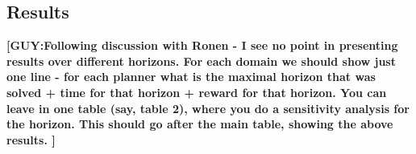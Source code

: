 \documentclass[letterpaper]{article} %
\theoremstyle{definition}
\newcommand{\guy}[1]{\textbf{[\color{orange}GUY:#1]}}
\begin{document}
\subsection{Results}


\guy{Following discussion with Ronen - I see no point in presenting results over different horizons. For each domain we should show just one line - for each planner what is the maximal horizon that was solved + time for that horizon + reward for that horizon.
You can leave in one table (say, table 2), where you do a sensitivity analysis for the horizon. This should go after the main table, showing the above results.
}

\begin{table}
\centering
\scriptsize
    \caption{\label{tbl:scale} The results for configurations BP-31211, BP-22202 and BP-22203. FDMAP outperforms DP-JESP and GMAA-ICE with respect to both running time and policy value. The running time is improved significantly. Results are for maximal reached planning horizon, specified under the -H- column.}
\end{table}
\end{document}
